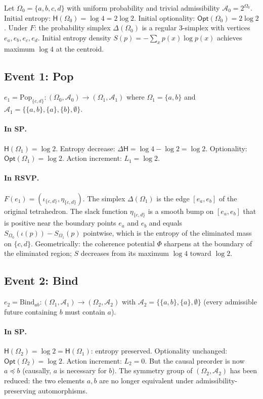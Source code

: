 \documentclass[12pt,a4paper]{article}
\theoremstyle{definition}
\theoremstyle{remark}
\newcommand{\Ent}{\ensuremath{\mathsf{H}}}
\newcommand{\Opt}{\ensuremath{\mathsf{Opt}}}
\newcommand{\SP}{\mathbf{SP}}
\newcommand{\RSVP}{\mathbf{RSVP}}
\newcommand{\Pop}{\ensuremath{\mathrm{Pop}}}
\newcommand{\Bind}{\ensuremath{\mathrm{Bind}}}
\newcommand{\PhiF}{\Phi}
\newcommand{\SF}{S}
\begin{document}
Let $\Omega_0=\{a,b,c,d\}$ with uniform probability and trivial admissibility
$\mathcal{A}_0=2^{\Omega_0}$. Initial entropy: $\Ent(\Omega_0)=\log 4=2\log 2$.
Initial optionality: $\Opt(\Omega_0)=2\log 2$. Under $F$: the probability simplex
$\Delta(\Omega_0)$ is a regular 3-simplex with vertices $e_a,e_b,e_c,e_d$.
Initial entropy density $\SF(p)=-\sum_x p(x)\log p(x)$ achieves maximum $\log 4$
at the centroid.

\subsection{Event 1: Pop}

$e_1=\Pop_{\{c,d\}}:(\Omega_0,\mathcal{A}_0)\to(\Omega_1,\mathcal{A}_1)$
where $\Omega_1=\{a,b\}$ and $\mathcal{A}_1=\{\{a,b\},\{a\},\{b\},\emptyset\}$.

\paragraph{In $\SP$.}
$\Ent(\Omega_1)=\log 2$. Entropy decrease: $\Delta\Ent=\log 4-\log 2=\log 2$.
Optionality: $\Opt(\Omega_1)=\log 2$. Action increment: $L_1=\log 2$.

\paragraph{In $\RSVP$.}
$F(e_1)=(\iota_{\{c,d\}},\eta_{\{c,d\}})$. The simplex $\Delta(\Omega_1)$ is the edge
$[e_a,e_b]$ of the original tetrahedron. The slack function $\eta_{\{c,d\}}$ is a
smooth bump on $[e_a,e_b]$ that is positive near the boundary points $e_a$ and $e_b$
and equals $\SF_{\Omega_0}(\iota(p))-\SF_{\Omega_1}(p)$ pointwise, which is the
entropy of the eliminated mass on $\{c,d\}$. Geometrically: the coherence potential
$\PhiF$ sharpens at the boundary of the eliminated region; $\SF$ decreases from
its maximum $\log 4$ toward $\log 2$.

\subsection{Event 2: Bind}

$e_2=\Bind_{ab}:(\Omega_1,\mathcal{A}_1)\to(\Omega_2,\mathcal{A}_2)$
with $\mathcal{A}_2=\{\{a,b\},\{a\},\emptyset\}$ (every admissible future containing
$b$ must contain $a$).

\paragraph{In $\SP$.}
$\Ent(\Omega_2)=\log 2=\Ent(\Omega_1)$: entropy preserved. Optionality unchanged:
$\Opt(\Omega_2)=\log 2$. Action increment: $L_2=0$. But the causal preorder is
now $a\preceq b$ (causally, $a$ is necessary for $b$). The symmetry group of
$(\Omega_2,\mathcal{A}_2)$ has been reduced: the two elements $a,b$ are no longer
equivalent under admissibility-preserving automorphisms.
\end{document}
